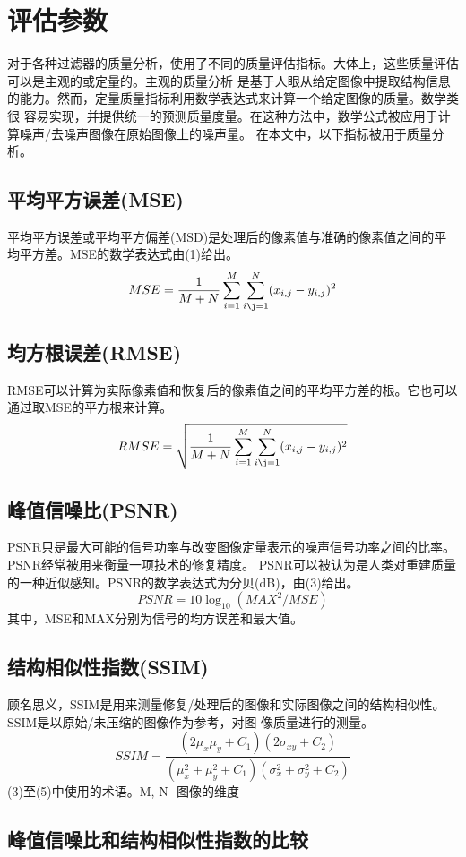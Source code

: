 \documentclass{article} %
\begin{document}
\section{评估参数}
对于各种过滤器的质量分析，使用了不同的质量评估指标。大体上，这些质量评估可以是主观的或定量的。主观的质量分析
是基于人眼从给定图像中提取结构信息的能力。然而，定量质量指标利用数学表达式来计算一个给定图像的质量。数学类很
容易实现，并提供统一的预测质量度量。在这种方法中，数学公式被应用于计算噪声/去噪声图像在原始图像上的噪声量。
在本文中，以下指标被用于质量分析。

\subsection{平均平方误差(MSE)}
平均平方误差或平均平方偏差(MSD)是处理后的像素值与准确的像素值之间的平均平方差。MSE的数学表达式由(1)给出。
\begin{equation}
    MSE= \frac{1}{M+N}\sum_{i=1}^M\sum_{i\j=1}^N(x_{i,j}-y_{i,j})^2
\end{equation}

\subsection{均方根误差(RMSE)}
RMSE可以计算为实际像素值和恢复后的像素值之间的平均平方差的根。它也可以通过取MSE的平方根来计算。
\begin{equation}
    RMSE=\sqrt{\frac{1}{M+N}\sum_{i=1}^M\sum_{i\j=1}^N(x_{i,j}-y_{i,j})^2}
\end{equation}

\subsection{峰值信噪比(PSNR)}
PSNR只是最大可能的信号功率与改变图像定量表示的噪声信号功率之间的比率。PSNR经常被用来衡量一项技术的修复精度。
PSNR可以被认为是人类对重建质量的一种近似感知。PSNR的数学表达式为分贝(dB)，由(3)给出。
\begin{equation}
    PSNR=10\log_{10}({MAX^2}/{MSE})
\end{equation}
其中，MSE和MAX分别为信号的均方误差和最大值。

\subsection{结构相似性指数(SSIM)}
顾名思义，SSIM是用来测量修复/处理后的图像和实际图像之间的结构相似性。SSIM是以原始/未压缩的图像作为参考，对图
像质量进行的测量。
\begin{equation}
    SSIM=\frac{(2\mu_x\mu_y+C_1)(2\sigma_{xy}+C_2)}{(\mu_x^2+\mu_y^2+C_1)(\sigma_x^2+\sigma_y^2+C_2)}
\end{equation}
(3)至(5)中使用的术语。M, N -图像的维度

\subsection{峰值信噪比和结构相似性指数的比较}
\end{document}
